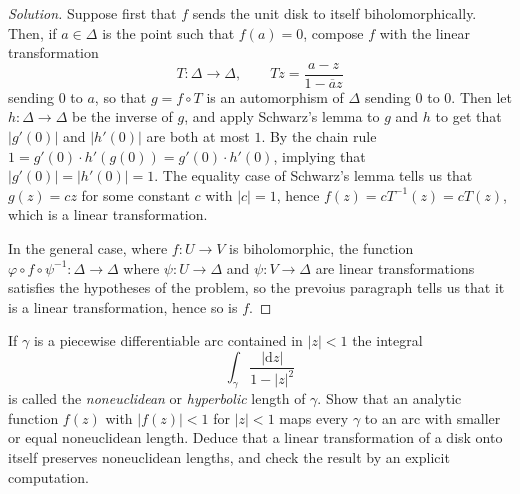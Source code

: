 \documentclass[10pt]{article}
\providecommand{\ol}{\overline}
\newcommand{\dd}{\mathrm{d}}
\providecommand{\inv}{^{-1}}
\newenvironment{soln}{\begin{proof}[Solution]}{\end{proof}}
\providecommand{\abs}[1]{\left\lvert #1\right\rvert}
\begin{document}
\begin{soln}
    Suppose first that $f$ sends the unit disk to itself
    biholomorphically. Then, if $a\in\Delta$ is the point
    such that $f(a) = 0$, compose $f$ with the linear transformation
    \begin{equation*}
        T\colon\Delta\to\Delta,\qquad
	Tz = \frac{a-z}{1-\ol az}
    \end{equation*}
    sending $0$ to $a$, so that $g = f\circ T$
    is an automorphism of $\Delta$ sending $0$ to $0$.
    Then let $h\colon \Delta\to\Delta$ be the inverse of $g$,
    and apply Schwarz's lemma to $g$ and $h$ to get that
    $\abs{g'(0)}$ and $\abs{h'(0)}$ are both at most $1$.
    By the chain rule $1 = g'(0)\cdot h'(g(0)) = g'(0)\cdot h'(0)$,
    implying that $\abs{g'(0)} = \abs{h'(0)} = 1$.
    The equality case of Schwarz's lemma tells us that
    $g(z) = cz$ for some constant $c$ with $\abs c = 1$,
    hence $f(z) = cT\inv(z) = cT(z)$, which is a linear transformation.

    In the general case, where $f\colon U\to V$
    is biholomorphic, the function
    $\varphi\circ f\circ\psi\inv\colon\Delta\to\Delta$
    where $\psi\colon U\to \Delta$ and $\psi\colon V\to\Delta$
    are linear transformations satisfies the hypotheses of the problem,
    so the prevoius paragraph tells us that it is a linear transformation,
    hence so is $f$.
\end{soln}

\begin{problem}
    [p.136\#6]
    If $\gamma$ is a piecewise differentiable arc contained in $\abs z < 1$
    the integral
    \begin{equation*}
	\int_\gamma \frac{\abs{\dd z}}{1-\abs z^2}
    \end{equation*}
    is called the \emph{noneuclidean} or \emph{hyperbolic} length of $\gamma$.
    Show that an analytic function $f(z)$ with $\abs{f(z)} < 1$
    for $\abs z < 1$ maps every $\gamma$ to
    an arc with smaller or equal noneuclidean length.
    Deduce that a linear transformation of a disk onto itself
    preserves noneuclidean lengths, and check the result
    by an explicit computation.
\end{problem}
\end{document}

